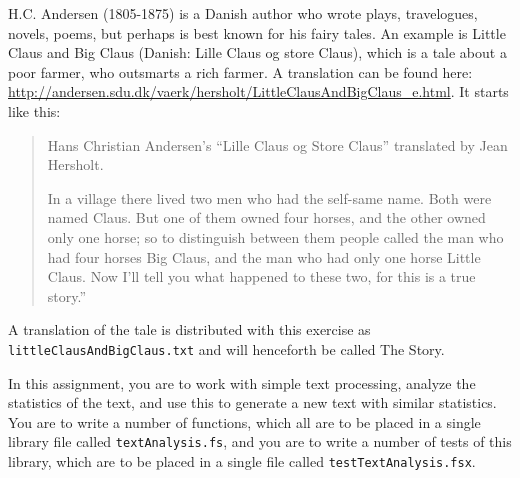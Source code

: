H.C. Andersen (1805-1875) is a Danish author who wrote plays, travelogues, novels, poems, but perhaps is best known for his fairy tales. An example is Little Claus and Big Claus (Danish: Lille Claus og store Claus), which is a tale about a poor farmer, who outsmarts a rich farmer. A translation can be found here: \url{http://andersen.sdu.dk/vaerk/hersholt/LittleClausAndBigClaus_e.html}. It starts like this:
\begin{quote}
  Hans Christian Andersen's ``Lille Claus og Store Claus'' translated by Jean Hersholt.

In a village there lived two men who had the self-same name. Both were named Claus. But one of them owned four horses, and the other owned only one horse; so to distinguish between them people called the man who had four horses Big Claus, and the man who had only one horse Little Claus. Now I'll tell you what happened to these two, for this is a true story.''
\end{quote}
A translation of the tale is distributed with this exercise as \lstinline[language=console]{littleClausAndBigClaus.txt} and will henceforth be called The Story.


In this assignment, you are to work with simple text processing, analyze the statistics of the text, and use this to generate a new text with similar statistics. You are to write a number of functions, which all are to be placed in a single library file called \lstinline[language=console]{textAnalysis.fs}, and you are to write a number of tests of this library, which are to be placed in a single file called \lstinline[language=console]{testTextAnalysis.fsx}.

